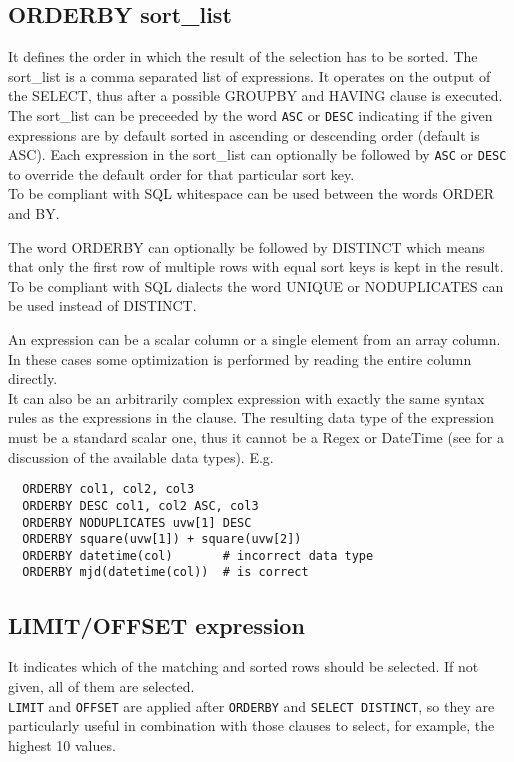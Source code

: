 \subsection{\label{TAQL:ORDERBY}ORDERBY sort\_list}
It defines the order in which the result of the selection
has to be sorted. The sort\_list is a comma separated list of
expressions. It operates on the output of the SELECT, thus after a
possible GROUPBY and HAVING clause is executed.
\\The sort\_list can be preceeded by the word \texttt{ASC} or
\texttt{DESC} indicating if the given expressions are by
default sorted in ascending or descending order (default is ASC).
Each expression in the sort\_list can optionally be
followed by \texttt{ASC} or \texttt{DESC} to override the
default order for that particular sort key.
\\To be compliant with SQL whitespace can be used between the
words ORDER and BY.

The word ORDERBY can optionally be followed by DISTINCT
which means that only the first row of multiple rows with
equal sort keys is kept in the result. To be compliant with
SQL dialects the word UNIQUE or NODUPLICATES can be used
instead of DISTINCT.

An expression can be a scalar column or a single element from
an array column. In these cases some optimization is performed
by reading the entire column directly.
\\It can also be an arbitrarily complex expression
with exactly the same syntax rules as the expressions in the
 clause.
The resulting data type of the expression must
be a standard scalar one, thus it cannot be a Regex or
DateTime (see  for a discussion
of the available data types).
E.g.
\begin{verbatim}
  ORDERBY col1, col2, col3
  ORDERBY DESC col1, col2 ASC, col3
  ORDERBY NODUPLICATES uvw[1] DESC
  ORDERBY square(uvw[1]) + square(uvw[2])
  ORDERBY datetime(col)       # incorrect data type
  ORDERBY mjd(datetime(col))  # is correct
\end{verbatim}

\subsection{LIMIT/OFFSET expression}
It indicates which of the matching and sorted rows should be
selected. If not given, all of them are selected.
\\\texttt{LIMIT} and \texttt{OFFSET} are applied after
\texttt{ORDERBY} and \texttt{SELECT DISTINCT},
so they are particularly useful in combination with those clauses
to select, for example, the highest 10 values.

